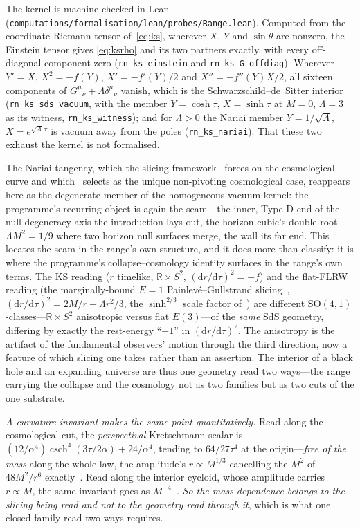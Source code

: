 \documentclass[11pt,a4paper]{article}
\theoremstyle{definition}
\newcommand{\dd}{\mathrm{d}}
\newcommand{\so}{\mathrm{SO}(4,1)}
\begin{document}
The kernel is machine-checked in Lean (\texttt{computations/formalisation/lean/probes/Range.lean}). Computed from the coordinate Riemann tensor of~\eqref{eq:ks}, wherever $X$, $Y$ and $\sin\theta$ are nonzero, the Einstein tensor gives \eqref{eq:ksrho} and its two partners exactly, with every off-diagonal component zero (\texttt{rn\_ks\_einstein} and \texttt{rn\_ks\_G\_offdiag}). Wherever $Y'=X$, $X^{2}=-f(Y)$, $X'=-f'(Y)/2$ and $X''=-f''(Y)X/2$, all sixteen components of $G^{\mu}{}_{\nu}+\Lambda\delta^{\mu}{}_{\nu}$ vanish, which is the Schwarzschild--de~Sitter interior (\texttt{rn\_ks\_sds\_vacuum}, with the member $Y=\cosh\tau$, $X=\sinh\tau$ at $M=0$, $\Lambda=3$ as its witness, \texttt{rn\_ks\_witness}); and for $\Lambda>0$ the Nariai member $Y=1/\sqrt\Lambda$, $X=e^{\sqrt\Lambda\,\tau}$ is vacuum away from the poles (\texttt{rn\_ks\_nariai}). That these two exhaust the kernel is not formalised.

The Nariai tangency, which the slicing framework~\cite{JanzenSlicing} forces on the cosmological curve and which~\cite{JanzenCRframework} selects as the unique non-pivoting cosmological case, reappears here as the degenerate member of the homogeneous vacuum kernel: the programme's recurring object is again the seam---the inner, Type-D end of the null-degeneracy axis the introduction lays out, the horizon cubic's double root $\Lambda M^{2}=1/9$ where two horizon null surfaces merge, the wall its far end. This locates the seam in the range's own structure, and it does more than classify: it is where the programme's collapse--cosmology identity surfaces in the range's own terms. The KS reading ($r$ timelike, $\mathbb{R}\times S^{2}$, $(\dd r/\dd\tau)^{2}=-f$) and the flat-FLRW reading (the marginally-bound $E=1$ Painlevé--Gullstrand slicing~\cite{Painleve1921,Gullstrand1922}, $(\dd r/\dd\tau)^{2}=2M/r+\Lambda r^{2}/3$, the $\sinh^{2/3}$ scale factor of~\cite{JanzenOperator}) are different $\so$-classes---$\mathbb{R}\times S^{2}$ anisotropic versus flat $E(3)$---of the \emph{same} SdS geometry, differing by exactly the rest-energy ``$-1$'' in $(\dd r/\dd\tau)^{2}$. The anisotropy is the artifact of the fundamental observers' motion through the third direction, now a feature of which slicing one takes rather than an assertion. The interior of a black hole and an expanding universe are thus one geometry read two ways---the range carrying the collapse and the cosmology not as two families but as two cuts of the one substrate.

\emph{A curvature invariant makes the same point quantitatively.} Read along the cosmological cut, the \emph{perspectival} Kretschmann scalar is $(12/\alpha^{4})\operatorname{csch}^{4}(3\tau/2\alpha)+24/\alpha^{4}$, tending to $64/27\tau^{4}$ at the origin---\emph{free of the mass} along the whole law, the amplitude's $r\propto M^{1/3}$ cancelling the $M^{2}$ of $48M^{2}/r^{6}$ exactly~\cite{JanzenOperator}. Read along the interior cycloid, whose amplitude carries $r\propto M$, the same invariant goes as $M^{-4}$~\cite{JanzenCircle,JanzenCRframework}. \emph{So the mass-dependence belongs to the slicing being read and not to the geometry read through it}, which is what one closed family read two ways requires.
\end{document}
